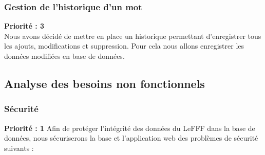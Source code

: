 \documentclass[12pt,a4paper]{article}
\begin{document}
\subsubsection{Gestion de l'historique d'un mot}
 \textbf{Priorité : 3} \\
Nous avons décidé de mettre en place un historique permettant d'enregistrer tous les ajouts, modifications et suppression. Pour cela nous allons enregistrer les données modifiées en base de données.
\subsection{Analyse des besoins non fonctionnels}
\smallbreak

\subsubsection{Sécurité}
\textbf{Priorité : 1}
\smallbreak
Afin de protéger l'intégrité des données du LeFFF dans la base de données, nous sécuriserons la base et l'application web des problèmes de sécurité suivants :
\end{document}

